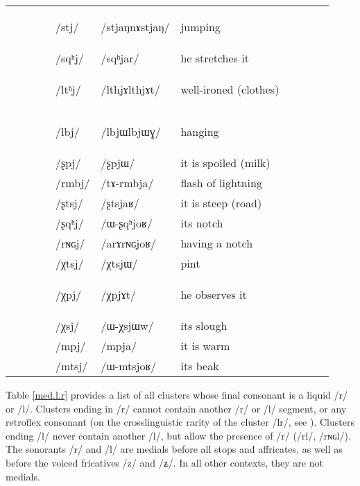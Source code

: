 \documentclass[oneside,a4paper,11pt]{article}
\newcommand{\ipa}[1]{\mbox{\phon/#1/}}
\newcommand{\trois}[1]{\ipa{#1}\addtocounter{3clusters}{1}}
\newcommand{\tib}[1]{\cellcolor{lightgray}\textbf{#1}}
\newcommand{\idph}[1]{\cellcolor{gray}\textbf{#1}}
\newcommand{\resetcounters}[2]{
\newcounter{#1}
\newcounter{#2}
 \setcounter{#1}{\value{2clusters}}
  \setcounter{#2}{\value{3clusters}}
 \setcounter{2clusters}{0}
  \setcounter{3clusters}{0}
}
\begin{document}
\begin{table}
{\begin{tabular}{l|lll|lll|lll|l}
 		 		& 		&		&		&\trois{stj}  \idph{}		&\ipa{stjaŋnɤstjaŋ} 		&jumping \\
 		& 		&		&		&\trois{sqʰj} 		&\ipa{sqʰjar} 		& he stretches it\\
\midrule										
 		& 		&		&		&\trois{ltʰj}  \idph{}		&\ipa{lthjɤlthjɤt} 		&well-ironed (clothes)\\
 		& 		&		&		&\trois{lbj} \idph{}		&\ipa{lbjɯlbjɯɣ} 		&hanging\\
\midrule												
 		& 		&		&		&\trois{ʂpj} 		&\ipa{ʂpjɯ} 		&it is spoiled (milk)\\
 		& 		&		&		&\trois{rmbj} 		&\ipa{tɤ-rmbja} 		&flash of lightning\\
 		& 		&		&		&\trois{ʂtsj} 		&\ipa{ʂtsjaʁ} 		&it is steep (road)\\
 		& 		&		&		&\trois{ʂqʰj} 		&\ipa{ɯ-ʂqʰjoʁ} 		&its notch\\
 		& 		&		&		&\trois{rɴɢj} 		&\ipa{arɤrɴɢjoʁ} 		&having a notch\\
\midrule												
 		& 		&		&		&\trois{χtsj} 		&\ipa{χtsjɯ} 		&pint\\
 		& 		&		&		&\trois{χpj} \tib{}		&\ipa{χpjɤt} 		&he  observes it\\
 		& 		&		&		&\trois{χsj} 		&\ipa{ɯ-χsjɯw} 		&its slough \\
\midrule												
 		& 		&		&		&\trois{mpj} 		&\ipa{mpja} 		&it is warm\\
 		& 		&		&		&\trois{mtsj} 		&\ipa{ɯ-mtsjoʁ} 		&its beak\\
\bottomrule
\end{tabular}}
\end{table}
  \resetcounters{2Cjw}{3Cjw} %
  
 Table \ref{med.l.r} provides a  list of all clusters whose final consonant is a liquid  \ipa{r} or \ipa{l}. Clusters ending in \ipa{r} cannot contain another \ipa{r} or \ipa{l} segment, or any retroflex consonant (on the crosslinguistic rarity of the cluster \ipa{lr}, see \citealt[78]{baroni14invariant}). Clusters ending \ipa{l} never contain another \ipa{l}, but allow the presence of \ipa{r} (\ipa{rl}, \ipa{rɴɢl}). The sonorants \ipa{r} and \ipa{l} are medials before all stops and affricates, as well as before the voiced fricatives \ipa{z} and \ipa{ʑ}. In all other contexts, they are not medials.
  
\end{document}
